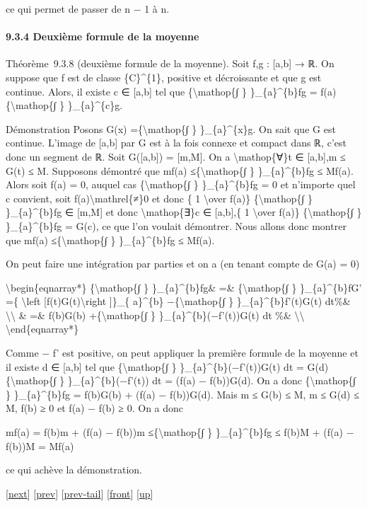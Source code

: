 \documentclass[]{article}
\begin{document}
ce qui permet de passer de n − 1 à n.

\paragraph{9.3.4 Deuxième formule de la moyenne}

Théorème~9.3.8 (deuxième formule de la moyenne). Soit f,g : {[}a,b{]} →
ℝ. On suppose que f est de classe \{C\}\^{}\{1\}, positive et
décroissante et que g est continue. Alors, il existe c ∈ {[}a,b{]} tel
que \{\textbackslash{}mathop\{∫ \} \}\_\{a\}\^{}\{b\}fg =
f(a)\{\textbackslash{}mathop\{∫ \} \}\_\{a\}\^{}\{c\}g.

Démonstration Posons G(x) =\{\textbackslash{}mathop\{∫ \}
\}\_\{a\}\^{}\{x\}g. On sait que G est continue. L'image de {[}a,b{]}
par G est à la fois connexe et compact dans ℝ, c'est donc un segment de
ℝ. Soit G({[}a,b{]}) = {[}m,M{]}. On a \textbackslash{}mathop\{∀\}t ∈
{[}a,b{]},m ≤ G(t) ≤ M. Supposons démontré que mf(a)
≤\{\textbackslash{}mathop\{∫ \} \}\_\{a\}\^{}\{b\}fg ≤ Mf(a). Alors soit
f(a) = 0, auquel cas \{\textbackslash{}mathop\{∫ \} \}\_\{a\}\^{}\{b\}fg
= 0 et n'importe quel c convient, soit f(a)\textbackslash{}mathrel\{≠\}0
et donc \{ 1 \textbackslash{}over f(a)\} \{\textbackslash{}mathop\{∫ \}
\}\_\{a\}\^{}\{b\}fg ∈ {[}m,M{]} et donc \textbackslash{}mathop\{∃\}c ∈
{[}a,b{]},\{ 1 \textbackslash{}over f(a)\} \{\textbackslash{}mathop\{∫
\} \}\_\{a\}\^{}\{b\}fg = G(c), ce que l'on voulait démontrer. Nous
allons donc montrer que mf(a) ≤\{\textbackslash{}mathop\{∫ \}
\}\_\{a\}\^{}\{b\}fg ≤ Mf(a).

On peut faire une intégration par parties et on a (en tenant compte de
G(a) = 0)

\textbackslash{}begin\{eqnarray*\} \{\textbackslash{}mathop\{∫ \}
\}\_\{a\}\^{}\{b\}fg\& =\& \{\textbackslash{}mathop\{∫ \}
\}\_\{a\}\^{}\{b\}fG' =\{ \textbackslash{}left
{[}f(t)G(t)\textbackslash{}right {]}\}\_\{ a\}\^{}\{b\}
−\{\textbackslash{}mathop\{∫ \} \}\_\{a\}\^{}\{b\}f'(t)G(t) dt\%\&
\textbackslash{}\textbackslash{} \& =\& f(b)G(b)
+\{\textbackslash{}mathop\{∫ \} \}\_\{a\}\^{}\{b\}(−f'(t))G(t) dt \%\&
\textbackslash{}\textbackslash{} \textbackslash{}end\{eqnarray*\}

Comme − f' est positive, on peut appliquer la première formule de la
moyenne et il existe d ∈ {[}a,b{]} tel que \{\textbackslash{}mathop\{∫
\} \}\_\{a\}\^{}\{b\}(−f'(t))G(t) dt = G(d)\{\textbackslash{}mathop\{∫
\} \}\_\{a\}\^{}\{b\}(−f'(t)) dt = (f(a) − f(b))G(d). On a donc
\{\textbackslash{}mathop\{∫ \} \}\_\{a\}\^{}\{b\}fg = f(b)G(b) + (f(a) −
f(b))G(d). Mais m ≤ G(b) ≤ M, m ≤ G(d) ≤ M, f(b) ≥ 0 et f(a) − f(b) ≥ 0.
On a donc

mf(a) = f(b)m + (f(a) − f(b))m ≤\{\textbackslash{}mathop\{∫ \}
\}\_\{a\}\^{}\{b\}fg ≤ f(b)M + (f(a) − f(b))M = Mf(a)

ce qui achève la démonstration.

{[}\href{coursse53.html}{next}{]} {[}\href{coursse51.html}{prev}{]}
{[}\href{coursse51.html\#tailcoursse51.html}{prev-tail}{]}
{[}\href{coursse52.html}{front}{]}
{[}\href{coursch10.html\#coursse52.html}{up}{]}
\end{document}

